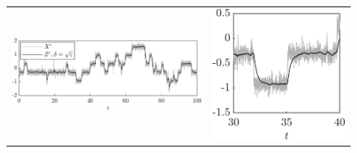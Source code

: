 \documentclass[10pt]{article}
\begin{document}
\begin{figure}[t]
\begin{tabular}{cc}
		\includegraphics[]{Figures/TrajD5} & \includegraphics[]{Figures/TrajD5Z} \\

\end{tabular}
\end{figure}
\end{document}
